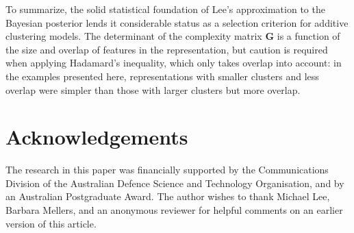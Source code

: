 \documentclass[doc,floatsintext]{apa6}
\newcommand{\mat}[1]{\mathbf{#1}}
\begin{document}
To summarize, the solid statistical foundation of Lee's \citeyear{lee01b} approximation to the Bayesian posterior lends it considerable status as a selection criterion for additive clustering models. The determinant of the complexity matrix $\mat{G}$ is a function of the size and overlap of features in the representation, but caution is required when applying Hadamard's inequality, which only takes overlap into account: in the examples presented here, representations with smaller clusters and less overlap were simpler than those with larger clusters but more overlap.

\section{Acknowledgements}
The research in this paper was financially supported by the Communications Division of the Australian Defence Science and Technology Organisation, and by an Australian Postgraduate Award. The author wishes to thank Michael Lee, Barbara Mellers, and an anonymous reviewer for helpful comments on an earlier version of this article.
\end{document}
